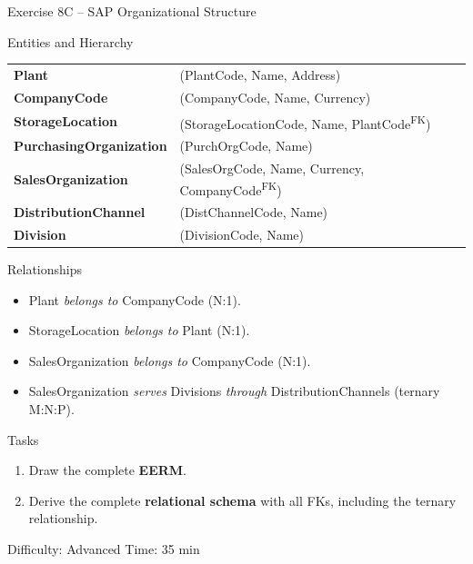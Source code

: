 \documentclass[10pt]{beamer}
\begin{document}
\begin{frame}{Exercise 8C -- SAP Organizational Structure}
  \begin{block}{Entities and Hierarchy}
    \small
    \begin{tabular}{@{}ll@{}}
      \textbf{Plant} & (PlantCode, Name, Address) \\
      \textbf{CompanyCode} & (CompanyCode, Name, Currency) \\
      \textbf{StorageLocation} & (StorageLocationCode, Name, PlantCode\textsuperscript{FK}) \\
      \textbf{PurchasingOrganization} & (PurchOrgCode, Name) \\
      \textbf{SalesOrganization} & (SalesOrgCode, Name, Currency, CompanyCode\textsuperscript{FK}) \\
      \textbf{DistributionChannel} & (DistChannelCode, Name) \\
      \textbf{Division} & (DivisionCode, Name) \\
    \end{tabular}
  \end{block}

  \begin{block}{Relationships}
    \begin{itemize}
      \item Plant \emph{belongs to} CompanyCode (N:1).
      \item StorageLocation \emph{belongs to} Plant (N:1).
      \item SalesOrganization \emph{belongs to} CompanyCode (N:1).
      \item SalesOrganization \emph{serves} Divisions \emph{through} DistributionChannels (ternary M:N:P).
    \end{itemize}
  \end{block}

  \begin{block}{Tasks}
    \begin{enumerate}
      \item Draw the complete \textbf{EERM}.
      \item Derive the complete \textbf{relational schema} with all FKs, including the ternary relationship.
    \end{enumerate}
  \end{block}

  \begin{alertblock}{Difficulty: Advanced \quad Time: 35 min}
  \end{alertblock}
\end{frame}
\end{document}
